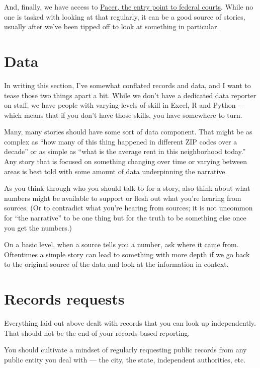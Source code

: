 \documentclass[
  11pt,
  american,
  letterpaperpaper,
  extrafontsizes,onecolumn,openright
  ]{memoir}
\begin{document}
And, finally, we have access to \href{https://pcl.uscourts.gov/pcl/index.jsf}{Pacer, the entry point to federal courts}. While no one is tasked with looking at that regularly, it can be a good source of stories, usually after we've been tipped off to look at something in particular.

\hypertarget{data}{%
\section*{Data}\label{data}}

In writing this section, I've somewhat conflated records and data, and I want to tease those two things apart a bit. While we don't have a dedicated data reporter on staff, we have people with varying levels of skill in Excel, R and Python --- which means that if you don't have those skills, you have somewhere to turn.

Many, many stories should have some sort of data component. That might be as complex as \enquote{how many of this thing happened in different ZIP codes over a decade} or as simple as \enquote{what is the average rent in this neighborhood today.} Any story that is focused on something changing over time or varying between areas is best told with some amount of data underpinning the narrative.

As you think through who you should talk to for a story, also think about what numbers might be available to support or flesh out what you're hearing from sources. (Or to contradict what you're hearing from sources; it is not uncommon for \enquote{the narrative} to be one thing but for the truth to be something else once you get the numbers.)

On a basic level, when a source tells you a number, ask where it came from. Oftentimes a simple story can lead to something with more depth if we go back to the original source of the data and look at the information in context.

\hypertarget{records-requests}{%
\section*{Records requests}\label{records-requests}}

Everything laid out above dealt with records that you can look up independently. That should not be the end of your records-based reporting.

You should cultivate a mindset of regularly requesting public records from any public entity you deal with --- the city, the state, independent authorities, etc.
\end{document}
